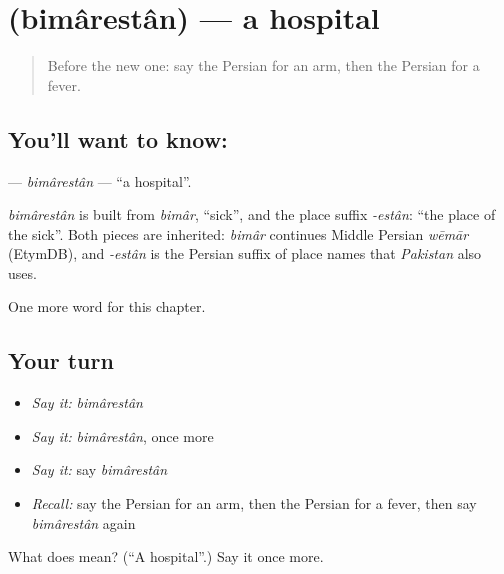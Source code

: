 \section[\texorpdfstring{\fa{بیمارستان} (bimârestân)}{بیمارستان (bimârestân)}]{ (bimârestân) — a hospital}

\label{lesson:FA-C30-bimarestan}



\begin{quote}
Before the new one: say the Persian for an arm, then the Persian for a fever.
\end{quote}

\subsection*{You'll want to know: }
\textbf{} — \emph{bimârestân} — \textquotedblleft{}a hospital\textquotedblright{}.

\begin{cousinweb}
\emph{bimârestân} is built from \emph{bimâr}, \textquotedblleft{}sick\textquotedblright{}, and the place suffix \emph{-estân}: \textquotedblleft{}the place of the sick\textquotedblright{}. Both pieces are inherited: \emph{bimâr} continues Middle Persian \emph{wēmār} (EtymDB), and \emph{-estân} is the Persian suffix of place names that \emph{Pakistan} also uses.
\end{cousinweb}

\begin{grammarlens}[title={What you've built}]
One more word for this chapter.
\end{grammarlens}

\subsection*{Your turn}
\begin{itemize}
\raggedright
  \item \emph{Say it:} \emph{bimârestân}
  \item \emph{Say it:} \emph{bimârestân}, once more
  \item \emph{Say it:} say \emph{bimârestân}
  \item \emph{Recall:} say the Persian for an arm, then the Persian for a fever, then say \emph{bimârestân} again
\end{itemize}

\begin{tcolorbox}[breakable,colback=teal!4,colframe=teal!35!black,title={Before you move on}]
What does  mean? (\textquotedblleft{}A hospital\textquotedblright{}.) Say it once more.
\end{tcolorbox}
